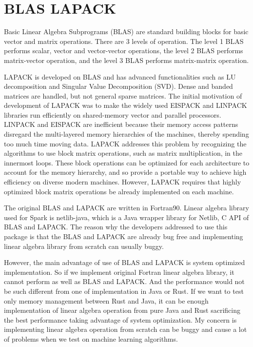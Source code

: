 \section{BLAS LAPACK}
\label{sec:history}

Basic Linear Algebra Subprograms (BLAS) are standard building blocks for basic vector and matrix operations. There are 3 levels of operation. The level 1 BLAS performs scalar, 
vector and vector-vector operations, the level 2 BLAS performs matrix-vector operation, and the level 3 BLAS performs matrix-matrix operation. 

LAPACK is developed on BLAS and has advanced functionalities such as LU decomposition and Singular Value Decomposition (SVD). Dense and banded matrices are handled, but not general 
sparse matrices. The initial motivation of development of LAPACK was to make the widely used EISPACK and LINPACK libraries run efficiently on shared-memory vector and parallel processors. 
LINPACK and EISPACK are inefficient because their memory access patterns disregard the multi-layered memory hierarchies of the machines, thereby spending too much time moving data. 
LAPACK addresses this problem by recognizing the algorithms to use block matrix operations, such as matrix multiplication, in the innermost loops. These block operations can be optimized for each architecture to account for the memory hierarchy, 
and so provide a portable way to achieve high efficiency on diverse modern machines. However, LAPACK requires that highly optimized block matrix operations be already implemented on each machine. 

The original BLAS and LAPACK are written in Fortran90. Linear algebra library used for Spark is netlib-java, which is a Java wrapper library for Netlib, C API of BLAS and LAPACK. 
The reason why the developers addressed to use this package is that the BLAS and LAPACK are already bug free and implementing linear algebra library from scratch can usually buggy. 

However, the main advantage of use of BLAS and LAPACK is system optimized implementation. So if we implement original Fortran linear algebra library, it cannot perform as well as BLAS and LAPACK. 
And the performance would not be such different from one of implementation in Java or Rust.  If we want to test only memory management between Rust and Java, 
it can be enough implementation of linear algebra operation from  pure Java and Rust sacrificing the best performance taking advantage of system optimization. 
My concern is implementing linear algebra operation from scratch can be buggy and cause a lot of problems when we test on machine learning algorithms.



